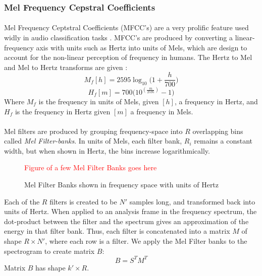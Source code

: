 \documentclass[12pt,letterpaper]{article}
\begin{document}

\subsubsection{Mel Frequency Cepstral Coefficients}

\paragraph*{}Mel Frequency Ceptstral Coefficients (MFCC's) are a very prolific feature used widly in audio classification tasks \cite{Liu,Virtanen,Zhang}. MFCC's are produced by converting a linear-frequency axis with units such as Hertz into units of Mels, which are design to account for the non-linear perception of frequency in humans. The Hertz to Mel and Mel to Hertz transforms are given \cite{Virtanen}:
\begin{equation}
\label{eqn-HztoMel}
M_f[h] = 2595 \log_{10}\big(1+ \frac{h}{700}\big)
\end{equation}
\begin{equation}
\label{eqn-MeltoHz}
H_f[m] = 700 \big(10^{(\frac{m}{2595})}-1\big)
\end{equation}
Where $M_f$ is the frequency in units of Mels, given $[h]$, a frequency in Hertz, and $H_f$ is the frequency in Hertz given $[m]$ a frequency in Mels.

\paragraph*{}Mel filters are produced by grouping frequency-space into $R$ overlapping bins called \textit{Mel Filter-banks}. In units of Mels, each filter bank, $R_i$ remains a constant width, but when shown in Hertz, the bins increase logarithmically. 
\begin{figure}[H]
\label{fig-MelFilterBanks}
\begin{center}
\textcolor{red}{Figure of a few Mel Filter Banks goes here}
\end{center}
\caption{Mel Filter Banks shown in frequency space with units of Hertz}
\end{figure}
Each of the $R$ filters is created to be $N'$ samples long, and transformed back into units of Hertz. When applied to an analysis frame in the frequency spectrum, the dot-product between the filter and the spectrum gives an approximation of the energy in that filter bank. Thus, each filter is concatenated into a matrix $M$ of shape $R \times N'$, where each row is a filter. We apply the Mel Filter banks to the spectrogram to create matrix $B$:
\begin{equation}
\label{eqn-FilterBanks}
B = S^T M^T
\end{equation}
Matrix $B$ has shape $k' \times R$.
\end{document}
